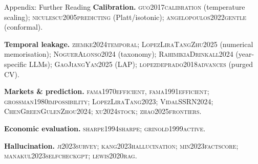\documentclass[9pt,t]{beamer}
\newcommand{\citesrc}[1]{\textsc{\small #1}}
\providecommand{\citet}[1]{\citesrc{#1}}
\begin{document}
\begin{frame}[noframenumbering]{Appendix: Further Reading}
\footnotesize
\textbf{Calibration.} \citet{guo2017calibration} (temperature scaling);
\citet{niculescu2005predicting} (Platt/isotonic);
\citet{angelopoulos2022gentle} (conformal).

\medskip
\textbf{Temporal leakage.} \citet{ziemke2024temporal};
\citet{LopezLiraTangZhu2025} (numerical memorisation);
\citet{NoguerAlonso2024} (taxonomy);
\citet{RahimikiaDrinkall2024} (year-specific LLMs);
\citet{GaoJiangYan2025} (LAP);
\citet{lopezdeprado2018advances} (purged CV).

\medskip
\textbf{Markets \& prediction.} \citet{fama1970efficient,
fama1991efficient}; \citet{grossman1980impossibility};
\citet{LopezLiraTang2023}; \citet{VidalSSRN2024};
\citet{ChenGreenGulenZhou2024}; \citet{xu2024stock};
\citet{zhao2025frontiers}.

\medskip
\textbf{Economic evaluation.} \citet{sharpe1994sharpe};
\citet{grinold1999active}.

\medskip
\textbf{Hallucination.} \citet{ji2023survey};
\citet{kang2023hallucination}; \citet{min2023factscore};
\citet{manakul2023selfcheckgpt}; \citet{lewis2020rag}.
\end{frame}
\end{document}
